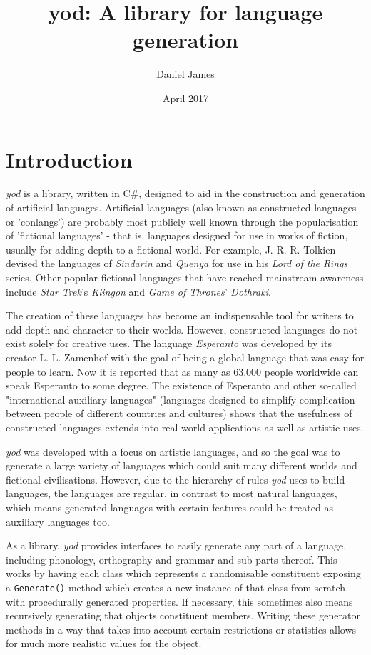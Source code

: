 \documentclass{report}
\title{yod: A library for language generation}
\author{Daniel James}
\date{April 2017}
\newcommand{\Csh}{C{\lserif\#}}
\begin{document}
   \maketitle
   
   \chapter{Introduction}
   \textit{yod} is a library, written in \Csh{}, designed to aid in the construction and generation of artificial languages. Artificial languages (also known as constructed languages or 'conlangs') are probably most publicly well known through the popularisation of 'fictional languages' - that is, languages designed for use in works of fiction, usually for adding depth to a fictional world. For example, J. R. R. Tolkien devised the languages of \textit{Sindarin} and \textit{Quenya} for use in his \textit{Lord of the Rings} series. Other popular fictional languages that have reached mainstream awareness include \textit{Star Trek}'s \textit{Klingon} and \textit{Game of Thrones}' \textit{Dothraki}.
   
   The creation of these languages has become an indispensable tool for writers to add depth and character to their worlds. However, constructed languages do not exist solely for creative uses. The language \textit{Esperanto} was developed by its creator L. L. Zamenhof with the goal of being a global language that was easy for people to learn\cite{unualibro}. Now it is reported that as many as 63,000 people worldwide can speak Esperanto to some degree\cite{esperanto}. The existence of Esperanto and other so-called "international auxiliary languages" (languages designed to simplify complication between people of different countries and cultures) shows that the usefulness of constructed languages extends into real-world applications as well as artistic uses.
   
   \textit{yod} was developed with a focus on artistic languages, and so the goal was to generate a large variety of languages which could suit many different worlds and fictional civilisations. However, due to the hierarchy of rules \textit{yod} uses to build languages, the languages are regular, in contrast to most natural languages, which means generated languages with certain features could be treated as auxiliary languages too.
   
   As a library, \textit{yod} provides interfaces to easily generate any part of a language, including phonology, orthography and grammar and sub-parts thereof. This works by having each class which represents a randomisable constituent exposing a \texttt{Generate()} method which creates a new instance of that class from scratch with procedurally generated properties. If necessary, this sometimes also means recursively generating that objects constituent members. Writing these generator methods in a way that takes into account certain restrictions or statistics allows for much more realistic values for the object.
   
\end{document}
